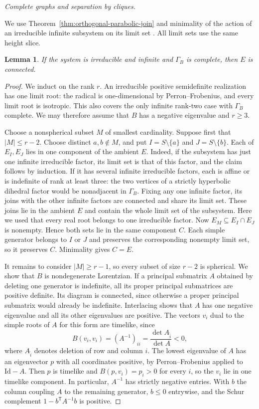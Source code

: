 \documentclass[11pt,reqno]{amsart}
\theoremstyle{plain}
\newtheorem{lemma}[theorem]{Lemma}
\theoremstyle{definition}
\theoremstyle{remark}
\numberwithin{equation}{section}
\begin{document}
\par\medskip
\noindent\emph{Complete graphs and separation by cliques.}

We use Theorem~\ref{thm:orthogonal-parabolic-join} and minimality of
the action of an irreducible infinite subsystem on its limit set
\cite[Theorem~3.1]{DHR}. All limit sets use the same height slice.

\begin{lemma}\label{p14:lem:complete-threshold}
If the system is irreducible and infinite and $\Gamma_B$ is
complete, then $E$ is connected.
\end{lemma}
\begin{proof}
We induct on the rank $r$. An irreducible positive semidefinite
realization has one limit root: the radical is one-dimensional
by Perron--Frobenius, and every limit root is isotropic. This also
covers the only infinite rank-two case with $\Gamma_B$ complete.
We may therefore assume that $B$ has a negative eigenvalue and
$r\geq3$.

Choose a nonspherical subset $M$ of smallest cardinality.
Suppose first that $|M|\leq r-2$. Choose distinct $a,b\notin M$,
and put $I=S\setminus\{a\}$ and $J=S\setminus\{b\}$. Each of
$E_I,E_J$ lies in one component of the ambient $E$. Indeed, if the
subsystem has just one infinite irreducible factor, its limit set is
that of this factor, and the claim follows by induction. If it has
several infinite irreducible factors, each is affine or is indefinite
of rank at least three: the two vertices of a strictly hyperbolic
dihedral factor would be nonadjacent in $\Gamma_B$. Fixing any one
infinite factor, its joins with the other infinite factors are
connected and share its limit set. These joins lie in the ambient
$E$ and contain the whole limit set of the subsystem. Here we used
that every real root belongs to one irreducible factor.
Now $E_M\subseteq E_I\cap E_J$ is nonempty. Hence both sets
lie in the same component $C$. Each simple generator belongs to
$I$ or $J$ and preserves the corresponding nonempty limit set, so
it preserves $C$. Minimality gives $C=E$.

It remains to consider $|M|\geq r-1$, so every subset of size
$r-2$ is spherical. We show that $B$ is nondegenerate Lorentzian.
If a principal submatrix $A$ obtained by deleting one generator
is indefinite, all its proper principal submatrices are positive
definite. Its diagram is connected, since otherwise a proper
principal submatrix would already be indefinite. Interlacing
shows that $A$ has one negative eigenvalue and all its other
eigenvalues are positive. The vectors $v_i$ dual to the simple
roots of $A$ for this form are timelike, since
\[
     B(v_i,v_i)=(A^{-1})_{ii}
       =\frac{\det A_{\widehat i}}{\det A}<0 ,
\]
where $A_{\widehat i}$ denotes deletion of row and column $i$.
The lowest eigenvalue of $A$ has an eigenvector $p$ with all
coordinates positive, by Perron--Frobenius applied to $\mathrm{Id}-A$. Then $p$ is timelike
and $B(p,v_i)=p_i>0$ for every $i$, so the $v_i$ lie in one
timelike component. In particular, $A^{-1}$ has strictly
negative entries. With $b$ the column coupling $A$ to the
remaining generator, $b\leq0$ entrywise, and the Schur
complement $1-b^{\mathsf T}A^{-1}b$ is positive.


\end{proof}
\end{document}
